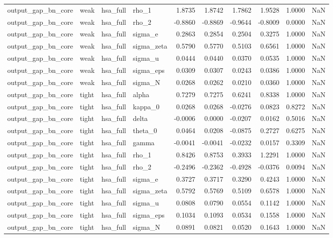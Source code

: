 \begin{tabular}{llllrrrrrl}
output\_gap\_bn\_core & weak & hsa\_full & rho\_1 & 1.8735 & 1.8742 & 1.7862 & 1.9528 & 1.0000 & NaN \\
output\_gap\_bn\_core & weak & hsa\_full & rho\_2 & -0.8860 & -0.8869 & -0.9644 & -0.8009 & 0.0000 & NaN \\
output\_gap\_bn\_core & weak & hsa\_full & sigma\_e & 0.2863 & 0.2854 & 0.2504 & 0.3275 & 1.0000 & NaN \\
output\_gap\_bn\_core & weak & hsa\_full & sigma\_zeta & 0.5790 & 0.5770 & 0.5103 & 0.6561 & 1.0000 & NaN \\
output\_gap\_bn\_core & weak & hsa\_full & sigma\_u & 0.0444 & 0.0440 & 0.0370 & 0.0535 & 1.0000 & NaN \\
output\_gap\_bn\_core & weak & hsa\_full & sigma\_eps & 0.0309 & 0.0307 & 0.0243 & 0.0386 & 1.0000 & NaN \\
output\_gap\_bn\_core & weak & hsa\_full & sigma\_N & 0.0268 & 0.0262 & 0.0210 & 0.0360 & 1.0000 & NaN \\
output\_gap\_bn\_core & tight & hsa\_full & alpha & 0.7279 & 0.7275 & 0.6241 & 0.8338 & 1.0000 & NaN \\
output\_gap\_bn\_core & tight & hsa\_full & kappa\_0 & 0.0268 & 0.0268 & -0.0276 & 0.0823 & 0.8272 & NaN \\
output\_gap\_bn\_core & tight & hsa\_full & delta & -0.0006 & 0.0000 & -0.0207 & 0.0162 & 0.5016 & NaN \\
output\_gap\_bn\_core & tight & hsa\_full & theta\_0 & 0.0464 & 0.0208 & -0.0875 & 0.2727 & 0.6275 & NaN \\
output\_gap\_bn\_core & tight & hsa\_full & gamma & -0.0041 & -0.0041 & -0.0232 & 0.0157 & 0.3309 & NaN \\
output\_gap\_bn\_core & tight & hsa\_full & rho\_1 & 0.8426 & 0.8753 & 0.3933 & 1.2291 & 1.0000 & NaN \\
output\_gap\_bn\_core & tight & hsa\_full & rho\_2 & -0.2496 & -0.2362 & -0.4928 & -0.0376 & 0.0094 & NaN \\
output\_gap\_bn\_core & tight & hsa\_full & sigma\_e & 0.3727 & 0.3717 & 0.3290 & 0.4243 & 1.0000 & NaN \\
output\_gap\_bn\_core & tight & hsa\_full & sigma\_zeta & 0.5792 & 0.5769 & 0.5109 & 0.6578 & 1.0000 & NaN \\
output\_gap\_bn\_core & tight & hsa\_full & sigma\_u & 0.0808 & 0.0790 & 0.0554 & 0.1142 & 1.0000 & NaN \\
output\_gap\_bn\_core & tight & hsa\_full & sigma\_eps & 0.1034 & 0.1093 & 0.0534 & 0.1558 & 1.0000 & NaN \\
output\_gap\_bn\_core & tight & hsa\_full & sigma\_N & 0.0891 & 0.0821 & 0.0520 & 0.1643 & 1.0000 & NaN \\
\bottomrule
\end{tabular}
